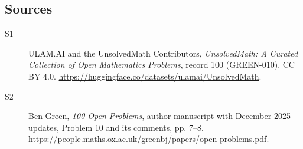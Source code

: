 \documentclass[11pt]{article}
\begin{document}
\subsection{Sources}
\begin{description}
\item[\hypertarget{source:100:1}{S1}] ULAM.AI and the UnsolvedMath Contributors, \emph{UnsolvedMath: A Curated Collection of Open Mathematics Problems}, record 100 (GREEN-010). CC BY 4.0. \url{https://huggingface.co/datasets/ulamai/UnsolvedMath}.
\item[\hypertarget{source:100:2}{S2}] Ben Green, \emph{100 Open Problems}, author manuscript with December 2025 updates, Problem 10 and its comments, pp. 7--8. \url{https://people.maths.ox.ac.uk/greenbj/papers/open-problems.pdf}.
\end{description}
\label{end:100}
\end{document}
